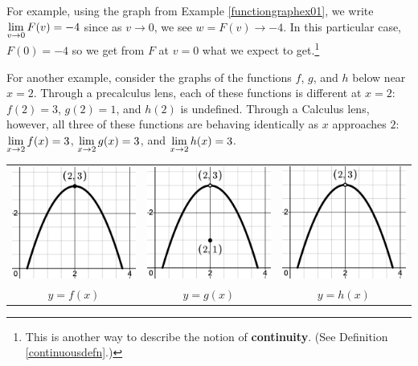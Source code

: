 \documentclass{ximera}
\begin{document}
\medskip

For example, using the graph from Example \ref{functiongraphex01}, we write $\ds{\lim_{v \rightarrow 0} F(v) = -4}$ since as $v \rightarrow 0$, we see $w = F(v) \rightarrow -4$.  In this particular case, $F(0) = -4$ so we get from $F$ at $v=0$ what we expect to get.\footnote{This is another way to describe the notion of \textbf{continuity}.  (See Definition \ref{continuousdefn}.)}

\medskip

For another example, consider the graphs of the functions $f$, $g$, and $h$ below near $x = 2$. Through a precalculus lens, each of these functions is different at $x = 2$:   $f(2) = 3$, $g(2) = 1$, and $h(2)$ is undefined.  Through a Calculus lens, however, all three of these functions are behaving identically as  $x$ approaches $2$:   $\ds{\lim_{x \rightarrow 2} f(x) = 3}$, $\ds{ \lim_{x \rightarrow 2} g(x)= 3}$, and $\ds{\lim_{x \rightarrow 2} h(x) = 3}$.


\begin{center}

\begin{tabular}{ccc}

 \includegraphics[width=2in]{./IntroLimitsGraphics/limitgrapha.png} &  \includegraphics[width=2in]{./IntroLimitsGraphics/limitgraphc.png} &  \includegraphics[width=2in]{./IntroLimitsGraphics/limitgraphb.png} \\
 
 $y = f(x)$ & $y = g(x)$ & $y = h(x)$ \\
 
 \end{tabular}
 
 \end{center}
 
\end{document}
